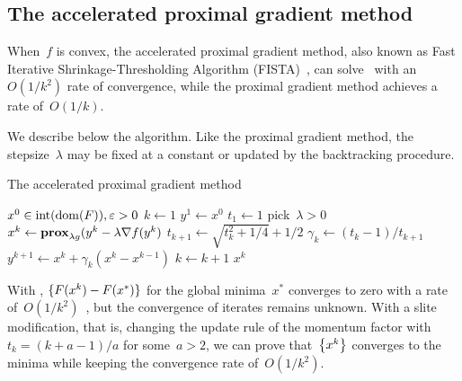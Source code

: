\documentclass[../../main]{subfiles}
\begin{document}
\subsection{The accelerated proximal gradient method} 
When~$f$ is convex, the accelerated proximal gradient method, also known as Fast Iterative Shrinkage-Thresholding Algorithm (FISTA)~\cite{Beck2009}, can solve~ with an~$O(1 / k^2)$ rate of convergence, while the proximal gradient method achieves a rate of~$O(1 / k)$.

We describe below the algorithm.
Like the proximal gradient method, the stepsize~$\lambda$ may be fixed at a constant or updated by the backtracking procedure.
\begin{algorithm}[hbtp]
    \caption{The accelerated proximal gradient method}
    \begin{algorithmic}[1]
        \Require $x^0 \in \interior (\dom (F)), \varepsilon > 0$
        \State $k \gets 1$
        \State $y^1 \gets x^0$
        \State $t_1 \gets 1$
        \Repeat
        \State pick~$\lambda > 0$
        \State $x^k \gets \prox_{\lambda g}(y^k - \lambda \nabla f(y^k)$
        \State $t_{k + 1} \gets \sqrt{t_k^2 + 1 / 4} + 1 / 2$
        \State $\gamma_k \gets (t_k - 1) / t_{k + 1}$
        \State $y^{k + 1} \gets x^k + \gamma_k (x^k - x^{k - 1})$
        \State $k \gets k + 1$
        \State \Return $x^k$
    \end{algorithmic}
\end{algorithm}

With , $\set{F(x^k) - F(x^\ast)}$ for the global minima~$x^\ast$ converges to zero with a rate of~$O(1 / k^2)$~\cite{Beck2009}, but the convergence of iterates remains unknown.
With a slite modification, that is, changing the update rule of the momentum factor with~$t_k = (k + a - 1) / a$ for some~$a > 2$, we can prove that~$\set*{x^k}$ converges to the minima while keeping the convergence rate of~$O(1 / k^2)$.
\end{document}
